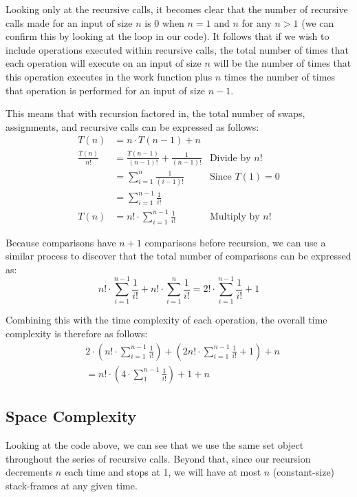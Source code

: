 \documentclass[10pt, oneside]{article}   	%
\begin{document}
Looking only at the recursive calls, it becomes clear that the number of recursive calls made for an input of size $n$ is 0 when $n = 1$ and $n$ for any $n > 1$ (we can confirm this by looking at the loop in our code). It follows that if we wish to include operations executed within recursive calls, the total number of times that each operation will execute on an input of size $n$ will be the number of times that this operation executes in the work function plus $n$ times the number of times that operation is performed for an input of size $n - 1$.

This means that with recursion factored in, the total number of swaps, assignments, and recursive calls can be expressed as follows:
\begin{align*}
	T(n) &= n \cdot T(n - 1) + n \\
	\frac{T(n)}{n!} &= \frac{T(n - 1)}{(n - 1)!} + \frac{1}{(n - 1)!} &\text{Divide by $n!$} \\
	&= \sum_{i = 1}^{n} \frac{1}{(i - 1)!} &\text{Since $T(1) = 0$} \\
	&= \sum_{i = 1}^{n - 1} \frac{1}{i!} \\
	T(n) &= n! \cdot \sum_{i = 1}^{n - 1} \frac{1}{i!} &\text{Multiply by $n!$}
\end{align*}

Because comparisons have $n + 1$ comparisons before recursion, we can use a similar process to discover that the total number of comparisons can be expressed as:
\[
	n! \cdot \sum_{i = 1}^{n - 1} \frac{1}{i!} + n! \cdot \sum_{i = 1}^{n} \frac{1}{i!} = 2! \cdot \sum_{i = 1}^{n - 1} \frac{1}{i!} + 1
\]

Combining this with the time complexity of each operation, the overall time complexity is therefore as follows:
\begin{align*}
	&2 \cdot \left( n! \cdot \sum_{i = 1}^{n - 1} \frac{1}{i!} \right) + \left( 2n! \cdot \sum_{i = 1}^{n - 1} \frac{1}{i!} + 1 \right) + n \\
	&= n! \cdot \left( 4 \cdot \sum_{1}^{n - 1} \frac{1}{i!} \right) + 1 + n
\end{align*}

\subsection{Space Complexity}

Looking at the code above, we can see that we use the same set object throughout the series of recursive calls. Beyond that, since our recursion decrements $n$ each time and stops at 1, we will have at most $n$ (constant-size) stack-frames at any given time.
\end{document}
